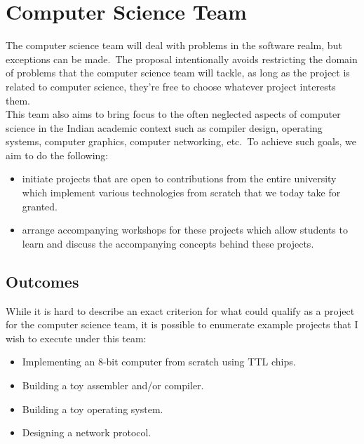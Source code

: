 \section{Computer Science Team}\label{sec:computer-science-team}
The computer science team will deal with problems in the software realm, but exceptions can be made.\ The proposal
intentionally avoids restricting the domain of problems that the computer science team will tackle, as long as the
project is related to computer science, they're free to choose whatever project interests them.
\\
This team also aims to bring focus to the often neglected aspects of computer science in the Indian academic context
such as compiler design, operating systems, computer graphics, computer networking, etc.\ To achieve such goals, we aim
to do the following:

\begin{itemize}
    \item initiate projects that are open to contributions from the entire university which implement various
    technologies from scratch that we today take for granted.
    \item arrange accompanying workshops for these projects which allow students to learn and discuss the accompanying
    concepts behind these projects.
\end{itemize}


\subsection{Outcomes}\label{subsec:cst-outcomes}
While it is hard to describe an exact criterion for what could qualify as a project for the computer science team, it is
possible to enumerate example projects that I wish to execute under this team:

\begin{itemize}
    \item Implementing an 8-bit computer from scratch using TTL chips.
    \item Building a toy assembler and/or compiler.
    \item Building a toy operating system.
    \item Designing a network protocol.
\end{itemize}